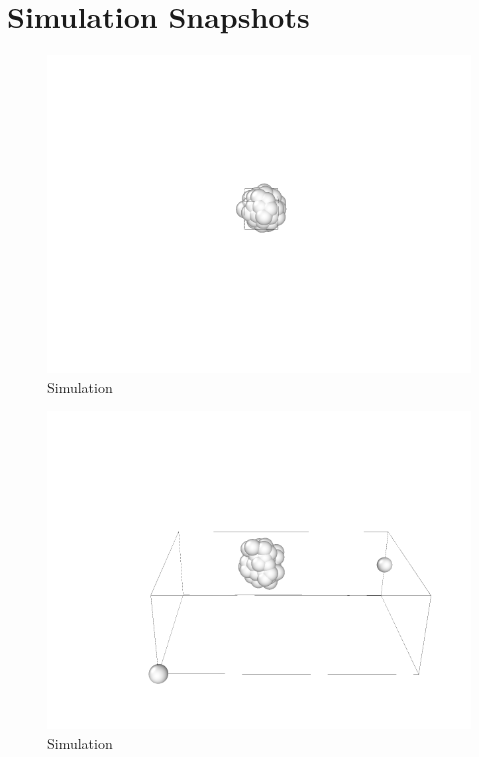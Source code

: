 \section{Simulation Snapshots}
\begin{figure}[!h]
	\begin{center}
		\includegraphics[scale= 1]{Figure/1Image.png}
	\end{center}
	\caption[Simulation]{Simulation }
	\label{Simulation1}
\end{figure}
\begin{figure}[!h]
	\begin{center}
		\includegraphics[scale=1]{Figure/2Image.png}
	\end{center}
	\caption[Simulation]{Simulation }
	\label{Simulation2}
\end{figure}
